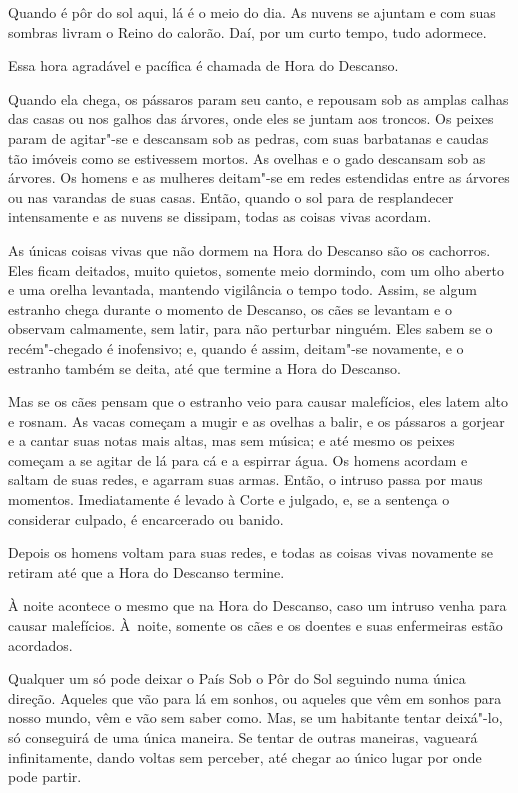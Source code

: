 Quando é pôr do sol aqui, lá é o meio do dia. As nuvens se ajuntam e com
suas sombras livram o Reino do calorão. Daí, por um curto tempo, tudo
adormece.

Essa hora agradável e pacífica é chamada de Hora do Descanso.

Quando ela chega, os pássaros param seu canto, e repousam sob as amplas
calhas das casas ou nos galhos das árvores, onde eles se juntam aos
troncos. Os peixes param de agitar"-se e descansam sob as pedras, com suas
barbatanas e caudas tão imóveis como se estivessem mortos. As ovelhas e
o gado descansam sob as árvores. Os homens e as mulheres deitam"-se em
redes estendidas entre as árvores ou nas varandas de suas casas.
Então, quando o sol para de resplandecer intensamente e as nuvens se
dissipam, todas as coisas vivas acordam.

As únicas coisas vivas que não dormem na Hora do Descanso são os
cachorros. Eles ficam deitados, muito quietos, somente meio dormindo,
com um olho aberto e uma orelha levantada, mantendo vigilância o tempo
todo. Assim, se algum estranho chega durante o momento de Descanso, os
cães se levantam e o observam calmamente, sem latir, para não
perturbar ninguém. Eles sabem se o recém"-chegado é inofensivo; e, quando
é assim, deitam"-se novamente, e o estranho também se deita, até que
termine a Hora do Descanso.

Mas se os cães pensam que o estranho veio para causar malefícios, eles
latem alto e rosnam. As vacas começam a mugir e as ovelhas a balir, e os
pássaros a gorjear e a cantar suas notas mais altas, mas sem música; e
até mesmo os peixes começam a se agitar de lá para cá e a espirrar água.
Os homens acordam e saltam de suas redes, e agarram suas armas. Então, o
intruso passa por maus momentos. Imediatamente é levado à Corte e
julgado, e, se a sentença o considerar culpado, é encarcerado ou banido.

Depois os homens voltam para suas redes, e todas as coisas vivas
novamente se retiram até que a Hora do Descanso termine.

À noite acontece o mesmo que na Hora do Descanso, caso um intruso venha
para causar malefícios. À~noite, somente os cães e os doentes e suas
enfermeiras estão acordados.

Qualquer um só pode deixar o País Sob o Pôr do Sol seguindo numa única
direção. Aqueles que vão para lá em sonhos, ou aqueles que vêm em sonhos para
nosso mundo, vêm e vão sem saber como. Mas, se um habitante tentar
deixá"-lo, só conseguirá de uma única maneira. Se tentar de outras maneiras, vagueará
infinitamente, dando voltas sem perceber, até chegar ao único lugar por
onde pode partir.

